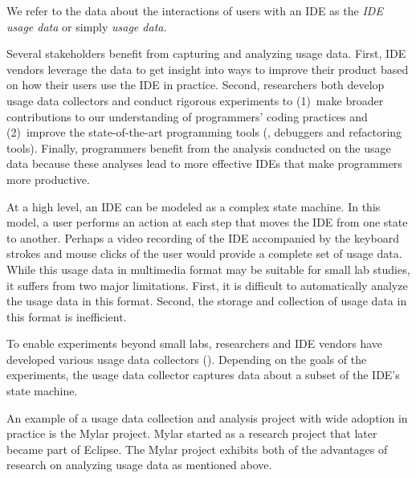 We refer to the data about the interactions of users with an IDE as the
\emph{IDE usage data} or simply \emph{usage data}.

%
Several stakeholders benefit from capturing and analyzing usage data. First, IDE
vendors leverage the data to get insight into ways to improve their product
based on how their users use the IDE in practice. Second, researchers both
develop usage data collectors and conduct rigorous experiments to (1)~make
broader contributions to our understanding of programmers' coding practices and
(2)~improve the state-of-the-art programming tools (\eg, debuggers and
refactoring tools). Finally, programmers benefit from the analysis conducted on
the usage data because these analyses lead to more effective IDEs that make
programmers more productive.

At a high level, an IDE can be modeled as a complex state machine. In this
model, a user performs an action at each step that moves the IDE from one state
to another.
%
Perhaps a video recording of the IDE accompanied by the keyboard strokes and
mouse clicks of the user would provide a complete set of usage data.
%
While this usage data in multimedia format may be suitable for small lab
studies, it suffers from two major limitations. First, it is difficult to
automatically analyze the usage data in this format. Second, the storage and
collection of usage data in this format is inefficient.

To enable experiments beyond small labs, researchers and IDE vendors have
developed various usage data collectors ().
Depending on the goals of the experiments, the usage data collector captures
data about a subset of the IDE's state machine.

An example of a usage data collection and analysis project with wide adoption
in practice is the Mylar project. Mylar started as a research project that later
became part of Eclipse. The Mylar project exhibits both of the advantages of
research on analyzing usage data as mentioned above.

